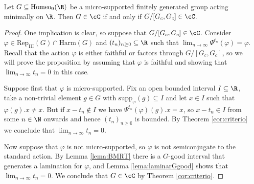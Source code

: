 \documentclass[reqno]{amsart}
\begin{document}
\begin{prop} \label{prop:micro}
	Let $G \subseteq \mathrm{Homeo}_0(\R)$ be a micro-supported finitely generated group acting minimally on $\R$. Then $G \in \cC$ if and only if $G/[G_c, G_c] \in \cC$.
\end{prop}
\begin{proof}
One implication is clear, so suppose that $G/[G_c, G_c] \in \cC$. Consider $\varphi \in \mathrm{Rep}_\mathrm{III}(G) \cap \mathrm{Harm}(G)$ and $(t_n)_{n \geq 0} \subseteq \R$ such that $\lim_{n \to \infty} \Psi^{t_n}(\varphi) = \varphi$. Recall that the action $\varphi$ is either faithful or factors through $G/[G_c, G_c]$, so we will prove the proposition by assuming that $\varphi$ is faithful and showing that $\lim_{n \to \infty} t_n = 0$ in this case.

Suppose first that $\varphi$ is micro-supported. Fix an open bounded interval $I \subseteq \R$, take a non-trivial element $g \in G$ with $\mathrm{supp}_\varphi(g) \subseteq I$ and let $x \in I$ such that $\varphi(g).x \neq x$. But if $x-t_n \not \in I$ we have $\Psi^{t_n}(\varphi)(g).x = x$, so $x - t_n \in I$ from some $n \in \N$ onwards and hence $(t_n)_{n \geq 0}$ is bounded. By Theorem \ref{cor:criterio} we conclude that $\lim_{n \to \infty} t_n = 0$.

Now suppose that $\varphi$ is not micro-supported, so $\varphi$ is not semiconjugate to the standard action. By Lemma \ref{lema:BMRT} there is a $G$-good interval that generates a lamination for $\varphi$, and Lemma \ref{lema:laminarGgood} shows that $\lim_{n \to \infty} t_n = 0$. We conclude that $G \in \cC$ by Theorem \ref{cor:criterio}.
\end{proof}
\end{document}
